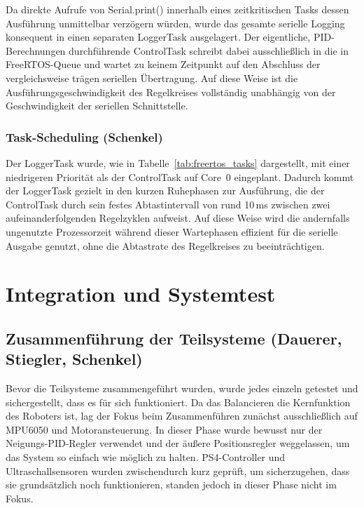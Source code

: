 \documentclass[fontsize=12pt,
parskip=half,	%
department=FakM,  %
logostyle=flat,
twoside, %
DIV=15,BCOR=10mm, %
]{OTHRreprt}
\begin{document}
Da direkte Aufrufe von Serial.print() innerhalb eines zeitkritischen Tasks dessen Ausführung unmittelbar verzögern würden, wurde das gesamte serielle Logging konsequent in einen separaten Log\-ger\-Task ausgelagert.
Der eigentliche, PID-Berechnungen durchführende ControlTask schreibt dabei ausschließlich in die in FreeRTOS-Queue und wartet zu keinem Zeitpunkt auf den Abschluss der vergleichsweise trägen seriellen Übertragung. 
Auf diese Weise ist die Ausführungsgeschwindigkeit des Regelkreises vollständig unabhängig von der Geschwindigkeit der seriellen Schnittstelle.

\subsection{Task-Scheduling (Schenkel)}
\label{subsec:logger_scheduling}

Der LoggerTask wurde, wie in Tabelle~\ref{tab:freertos_tasks} dargestellt, mit einer niedrigeren Priorität als der ControlTask auf Core~0 eingeplant. 
Dadurch kommt der LoggerTask gezielt in den kurzen Ruhephasen zur Ausführung, die der ControlTask durch sein festes Abtastintervall von rund 10\,ms zwischen zwei aufeinanderfolgenden Regelzyklen aufweist. 
Auf diese Weise wird die andernfalls ungenutzte Prozessorzeit während dieser Wartephasen effizient für die serielle Ausgabe genutzt, ohne die Abtastrate des Regelkreises zu beeinträchtigen.

\chapter{Integration und Systemtest}
\label{ch:integration}

\section{Zusammenführung der Teilsysteme (Dauerer, Stiegler, Schenkel)}
\label{sec:zusammenfuehrung}

Bevor die Teilsysteme zusammengeführt wurden, wurde jedes einzeln getestet und sichergestellt, dass es für sich funktioniert. Da das Balancieren die Kernfunktion des Roboters ist, lag der Fokus beim Zusammenführen zunächst ausschließlich auf MPU6050 und Motoransteuerung. In dieser Phase wurde bewusst nur der Neigungs-PID-Regler verwendet und der äußere Positionsregler weggelassen, um das System so einfach wie möglich zu halten. PS4-Controller und Ultraschallsensoren wurden zwischendurch kurz geprüft, um sicherzugehen, dass sie grundsätzlich noch funktionieren, standen jedoch in dieser Phase nicht im Fokus.
\end{document}
